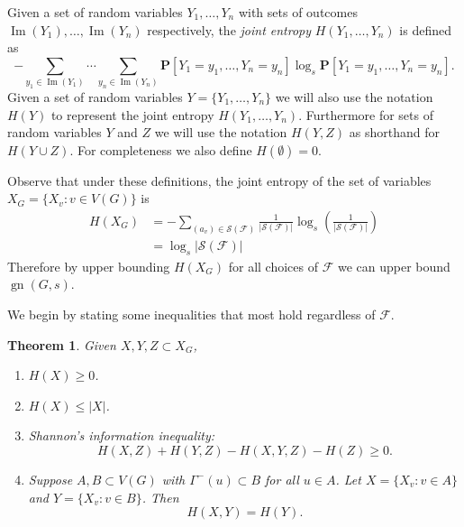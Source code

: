 \documentclass[a4paper, 14pt]{extarticle}
\theoremstyle{plain}
\newtheorem{theorem}[proposition]{Theorem}
\def\mc{\mathcal}
\def\mb{\mathbf}
\DeclareMathOperator{\gn}{gn}
\DeclareMathOperator{\Image}{Im}
\begin{document}
Given a set of random variables $Y_1,\ldots, Y_n$ with sets of
outcomes $\Image(Y_1),\ldots, \Image(Y_n)$ respectively, the \emph{joint
entropy} $H(Y_1,\ldots,Y_n)$ is defined as
\[
-\sum_{y_1\in\Image(Y_1)} \cdots \sum_{y_n\in\Image(Y_n)}
\mb{P}[Y_1=y_1,\ldots,Y_n=y_n]\log_s\mb{P}[Y_1=y_1,\ldots,Y_n=y_n].
\]
Given a set of random variables $Y = \{Y_1,\ldots,Y_n\}$ we will
also use the notation $H(Y)$ to represent the joint entropy
$H(Y_1,\ldots,Y_n)$. Furthermore for sets of random variables $Y$
and $Z$ we will use the notation $H(Y,Z)$ as shorthand for $H(Y\cup
Z)$. For completeness we also define $H(\emptyset)=0$.

Observe that under these definitions, the joint entropy of the set
of variables $X_G = \{X_v : v\in V(G)\}$ is
\begin{align*}
H(X_G) &= -\sum_{(a_v)\in\mc{S}(\mc{F})}
\frac{1}{|\mc{S}(\mc{F})|}\log_s\left(\frac{1}{|\mc{S}(\mc{F})|}\right)\\
&= \log_s |\mc{S}(\mc{F})|
\end{align*}
Therefore by upper bounding $H(X_G)$ for all choices of $\mc{F}$ we
can upper bound $\gn(G,s)$.

We begin by stating some inequalities that most hold regardless of
$\mc{F}$.

\begin{theorem}\label{Thm:ShannonEntropy}
Given $X,Y,Z\subset X_G$,
\begin{enumerate}
\item\label{Item:VarLowerBound} $H(X)\geq 0$.
\item\label{Item:VarUpperBound} $H(X)\leq |X|$.
\item\label{Item:VarShannon} Shannon's information inequality:
\[
H(X,Z)+H(Y,Z)-H(X,Y,Z)-H(Z)\geq 0.
\]
\item\label{Item:VarGraphConstraint} Suppose $A, B\subset V(G)$ with $\Gamma^-(u) \subset
B$ for all $u\in A$. Let $X=\{X_v : v\in A\}$ and $Y=\{X_v : v\in B\}$. Then
\[H(X,Y) = H(Y).\] 
\end{enumerate}
\end{theorem}
\end{document}
